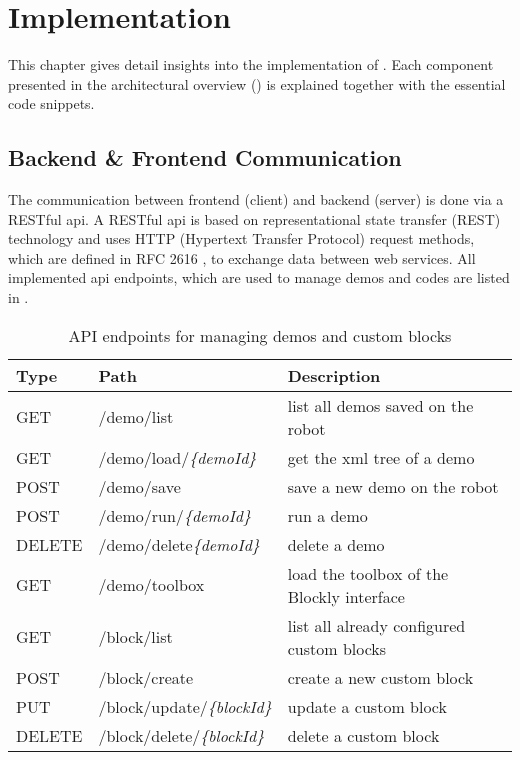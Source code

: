 \chapter{Implementation}
This chapter gives detail insights into the implementation of \toolname{}. Each component presented in the architectural overview () is explained together with the essential code snippets.

\section{Backend \& Frontend Communication}
The communication between frontend (client) and backend (server) is done via a RESTful \gls{api}. A RESTful \gls{api} is based on representational state transfer (REST) technology and uses HTTP (Hypertext Transfer Protocol) request methods, which are defined in RFC 2616 \cite{RFC2616}, to exchange data between web services. All implemented \gls{api} endpoints, which are used to manage demos and codes are listed in .

\begin{table}[htbp]
	\centering
	\begin{tabular}{l l l}
		\toprule
		Type   & Path                               & Description                                     \\
		\midrule
		GET    & /demo/list                         & list all demos saved on the robot               \\
		GET    & /demo/load/\textit{\{demoId\}}     & get the \gls{xml} tree of a demo        \\
		POST   & /demo/save                         & save a new demo on the robot                    \\
		POST   & /demo/run/\textit{\{demoId\}}      & run a demo                                      \\
		DELETE & /demo/delete\textit{\{demoId\}}    & delete a demo                                   \\
		GET    & /demo/toolbox                      & load the toolbox of the Blockly interface       \\
		GET    & /block/list                        & list all already configured custom blocks       \\
		POST   & /block/create                      & create a new custom block                       \\
		PUT    & /block/update/\textit{\{blockId\}} & update a custom block                           \\
		DELETE & /block/delete/\textit{\{blockId\}} & delete a custom block                           \\
		\bottomrule
	\end{tabular}
	\caption{API endpoints for managing demos and custom blocks}
	\label{tab:APIspec}
\end{table}


